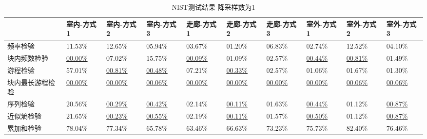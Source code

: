 \documentclass[master]{seuthesis} %
\begin{document}
\begin{Main}


\begin{table}[]
    \centering
    \tabulinesep=1.2mm
    \begin{tabu}to \linewidth{X[c,m]X[c,m]X[c,m]X[c,m]X[c,m]X[c,m]X[c,m]X[c,m]X[c,m]X[c,m]}
        \toprule
        \textbf{} & \textbf{室内-方式1} & \textbf{室内-方式2} & \textbf{室内-方式3} & \textbf{走廊-方式1} & \textbf{走廊-方式2} & \textbf{走廊-方式3} & 
        \textbf{室外-方式1} & \textbf{室外-方式2} & \textbf{室外-方式3} \\
        \midrule
        频率检验 & 11.53\%    & 12.65\%    & 05.94\%    & 03.67\%    & 01.20\%    & 06.83\%    & 02.74\%    & 12.52\%    & 04.10\% \\
        块内频数检验 & \underline{00.00\%}    & 07.02\%    & 15.75\%    & \underline{00.09\%}    & 01.09\%    & 02.57\%    & \underline{00.44\%}    & \underline{00.81\%}    & 01.49\% \\
        游程检验 & 57.01\%    & \underline{00.81\%}    & \underline{00.48\%}    & 07.21\%    & \underline{00.33\%}    & 02.57\%    & 01.06\%    & 01.67\%    & 01.30\% \\
        块内最长游程检验 & \underline{00.00\%}    & \underline{00.00\%}    & \underline{00.06\%}    & \underline{00.00\%}    & \underline{00.00\%}    & \underline{00.00\%}    & \underline{00.00\%}    & \underline{00.06\%}    & \underline{00.06\%} \\
        序列检验 & 20.56\%    & \underline{00.29\%}    & \underline{00.42\%}    & 02.14\%    & \underline{00.11\%}    & 01.63\%    & \underline{00.44\%}    & 01.12\%    & \underline{00.87\%} \\
        近似熵检验 & 21.65\%    & \underline{00.23\%}    & \underline{00.55\%}    & 02.19\%    & \underline{00.11\%}    & 01.57\%    & \underline{00.50\%}    & 01.12\%    & \underline{00.87\%} \\
        累加和检验 & 78.04\%    & 77.34\%    & 65.78\%    & 63.46\%    & 66.63\%    & 73.23\%    & 75.73\%    & 82.40\%    & 76.46\% \\
        \bottomrule
    \end{tabu}
    \caption{NIST测试结果 降采样数为1
    \label{NIST_test_result_1}}
\end{table}


\end{Main}
\end{document}
